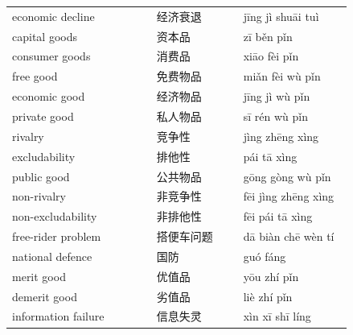 \documentclass[11pt]{article}
\begin{document}
\begin{longtable}{@{}p{0.40\linewidth}p{0.24\linewidth}p{0.30\linewidth}@{}}
economic decline & 经济衰退 & jīng jì shuāi tuì \\
capital goods & 资本品 & zī běn pǐn \\
consumer goods & 消费品 & xiāo fèi pǐn \\
free good & 免费物品 & miǎn fèi wù pǐn \\
economic good & 经济物品 & jīng jì wù pǐn \\
private good & 私人物品 & sī rén wù pǐn \\
rivalry & 竞争性 & jìng zhēng xìng \\
excludability & 排他性 & pái tā xìng \\
public good & 公共物品 & gōng gòng wù pǐn \\
non-rivalry & 非竞争性 & fēi jìng zhēng xìng \\
non-excludability & 非排他性 & fēi pái tā xìng \\
free-rider problem & 搭便车问题 & dā biàn chē wèn tí \\
national defence & 国防 & guó fáng \\
merit good & 优值品 & yōu zhí pǐn \\
demerit good & 劣值品 & liè zhí pǐn \\
information failure & 信息失灵 & xìn xī shī líng \\
\end{longtable}
\end{document}
